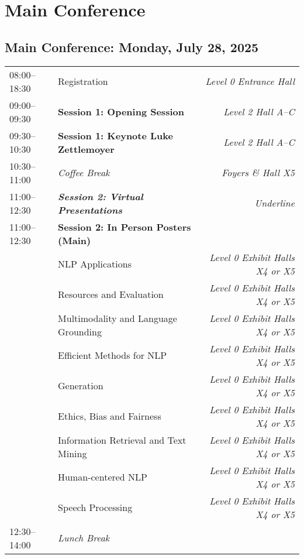 \chapter{Main Conference}

\begingroup

\renewcommand{\arraystretch}{1.8}

\section{Main Conference: Monday, July 28, 2025}

\begin{xltabular}{\linewidth}{l X r}
    08:00--18:30    &   Registration    &   \textit{Level 0 Entrance Hall} \\
    09:00--09:30    &   \textbf{Session 1: Opening Session}  &   \textit{Level 2 Hall A--C} \\
    09:30--10:30    &   \textbf{Session 1: Keynote Luke Zettlemoyer}    &   \textit{Level 2 Hall A--C} \\
    10:30--11:00    &   \textit{Coffee Break}    & \textit{Foyers \& Hall X5}  \\
    11:00--12:30    &   \textit{\textbf{Session 2: Virtual Presentations}}    & \textit{Underline}  \\
    11:00--12:30    &   \textbf{Session 2: In Person Posters (Main)} & \\
    &   NLP Applications  & \textit{Level 0 Exhibit Halls X4 or X5} \\
    &   Resources and Evaluation  & \textit{Level 0 Exhibit Halls X4 or X5} \\
    &   Multimodality and Language Grounding  & \textit{Level 0 Exhibit Halls X4 or X5} \\
    &   Efficient Methods for NLP  & \textit{Level 0 Exhibit Halls X4 or X5} \\
    &   Generation  & \textit{Level 0 Exhibit Halls X4 or X5} \\
    &   Ethics, Bias and Fairness  & \textit{Level 0 Exhibit Halls X4 or X5} \\
    &   Information Retrieval and Text Mining  & \textit{Level 0 Exhibit Halls X4 or X5} \\
    &   Human-centered NLP  & \textit{Level 0 Exhibit Halls X4 or X5} \\
    &   Speech Processing  & \textit{Level 0 Exhibit Halls X4 or X5} \\

    12:30--14:00    &   \textit{Lunch Break}  & \\


\end{xltabular}
